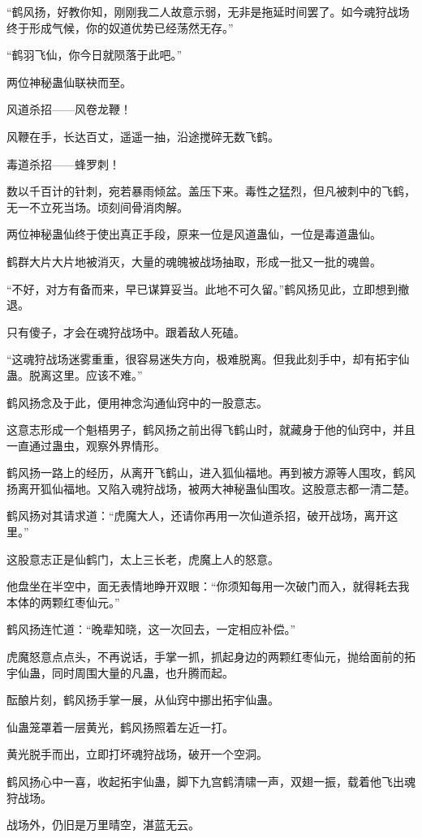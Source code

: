 \begin{this_body}
“鹤风扬，好教你知，刚刚我二人故意示弱，无非是拖延时间罢了。如今魂狩战场终于形成气候，你的奴道优势已经荡然无存。”

“鹤羽飞仙，你今日就陨落于此吧。”

两位神秘蛊仙联袂而至。

风道杀招——风卷龙鞭！

风鞭在手，长达百丈，遥遥一抽，沿途搅碎无数飞鹤。

毒道杀招——蜂罗刺！

数以千百计的针刺，宛若暴雨倾盆。盖压下来。毒性之猛烈，但凡被刺中的飞鹤，无一不立死当场。顷刻间骨消肉解。

两位神秘蛊仙终于使出真正手段，原来一位是风道蛊仙，一位是毒道蛊仙。

鹤群大片大片地被消灭，大量的魂魄被战场抽取，形成一批又一批的魂兽。

“不好，对方有备而来，早已谋算妥当。此地不可久留。”鹤风扬见此，立即想到撤退。

只有傻子，才会在魂狩战场中。跟着敌人死磕。

“这魂狩战场迷雾重重，很容易迷失方向，极难脱离。但我此刻手中，却有拓宇仙蛊。脱离这里。应该不难。”

鹤风扬念及于此，便用神念沟通仙窍中的一股意志。

这意志形成一个魁梧男子，鹤风扬之前出得飞鹤山时，就藏身于他的仙窍中，并且一直通过蛊虫，观察外界情形。

鹤风扬一路上的经历，从离开飞鹤山，进入狐仙福地。再到被方源等人围攻，鹤风扬离开狐仙福地。又陷入魂狩战场，被两大神秘蛊仙围攻。这股意志都一清二楚。

鹤风扬对其请求道：“虎魔大人，还请你再用一次仙道杀招，破开战场，离开这里。”

这股意志正是仙鹤门，太上三长老，虎魔上人的怒意。

他盘坐在半空中，面无表情地睁开双眼：“你须知每用一次破门而入，就得耗去我本体的两颗红枣仙元。”

鹤风扬连忙道：“晚辈知晓，这一次回去，一定相应补偿。”

虎魔怒意点点头，不再说话，手掌一抓，抓起身边的两颗红枣仙元，抛给面前的拓宇仙蛊，同时周围大量的凡蛊，也升腾而起。

酝酿片刻，鹤风扬手掌一展，从仙窍中挪出拓宇仙蛊。

仙蛊笼罩着一层黄光，鹤风扬照着左近一打。

黄光脱手而出，立即打坏魂狩战场，破开一个空洞。

鹤风扬心中一喜，收起拓宇仙蛊，脚下九宫鹤清啸一声，双翅一振，载着他飞出魂狩战场。

战场外，仍旧是万里晴空，湛蓝无云。


\end{this_body}
